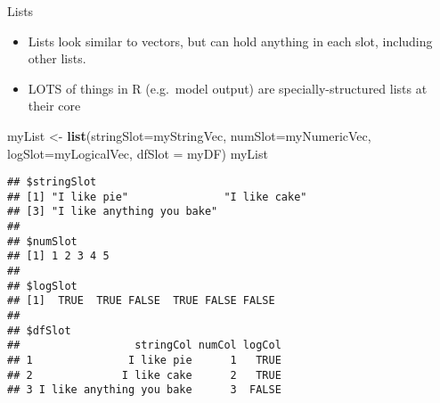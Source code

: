 \documentclass[
  ignorenonframetext,
  aspectratio=169]{beamer}
\newenvironment{Shaded}{\begin{snugshade}}{\end{snugshade}}
\newcommand{\AttributeTok}[1]{\textcolor[rgb]{0.13,0.29,0.53}{#1}}
\newcommand{\FunctionTok}[1]{\textcolor[rgb]{0.13,0.29,0.53}{\textbf{#1}}}
\newcommand{\NormalTok}[1]{#1}
\newcommand{\OtherTok}[1]{\textcolor[rgb]{0.56,0.35,0.01}{#1}}
\begin{document}
\begin{frame}[fragile]{Lists}
\protect\hypertarget{lists}{}
\begin{itemize}[<+->]
\item
  Lists look similar to vectors, but can hold anything in each slot,
  including other lists.
\item
  LOTS of things in R (e.g.~model output) are specially-structured lists
  at their core
\end{itemize}

\footnotesize

\begin{Shaded}
\begin{Highlighting}[]
\NormalTok{myList }\OtherTok{\textless{}{-}} \FunctionTok{list}\NormalTok{(}\AttributeTok{stringSlot=}\NormalTok{myStringVec, }\AttributeTok{numSlot=}\NormalTok{myNumericVec, }
                   \AttributeTok{logSlot=}\NormalTok{myLogicalVec, }\AttributeTok{dfSlot =}\NormalTok{ myDF)}
\NormalTok{myList}
\end{Highlighting}
\end{Shaded}

\begin{verbatim}
## $stringSlot
## [1] "I like pie"               "I like cake"             
## [3] "I like anything you bake"
## 
## $numSlot
## [1] 1 2 3 4 5
## 
## $logSlot
## [1]  TRUE  TRUE FALSE  TRUE FALSE FALSE
## 
## $dfSlot
##                  stringCol numCol logCol
## 1               I like pie      1   TRUE
## 2              I like cake      2   TRUE
## 3 I like anything you bake      3  FALSE
\end{verbatim}

\normalsize
\end{frame}
\end{document}
